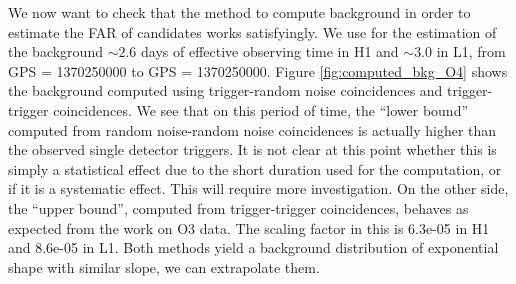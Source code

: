 We now want to check that the method to compute background in order to estimate the FAR of candidates works satisfyingly.
We use for the estimation of the background $\sim 2.6$ days of effective observing time in H1 and $\sim 3.0$ in L1, from GPS = 1370250000 to GPS = 1370250000.
Figure \ref{fig:computed_bkg_O4} shows the background computed using trigger-random noise coincidences and trigger-trigger coincidences.
We see that on this period of time, the ``lower bound'' computed from random noise-random noise coincidences is actually higher than the observed single detector triggers.
It is not clear at this point whether this is simply a statistical effect due to the short duration used for the computation, or if it is a systematic effect.
This will require more investigation.
On the other side, the ``upper bound'', computed from trigger-trigger coincidences, behaves as expected from the work on O3 data.
The scaling factor in this is 6.3e-05 in H1 and 8.6e-05 in L1.
Both methods yield a background distribution of exponential shape with similar slope, we can extrapolate them.

